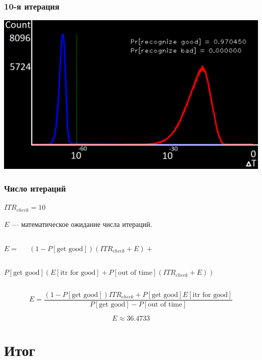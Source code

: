 \documentclass{beamer}
\begin{document}
\begin{frame}
	\frametitle{10-я итерация}
	
	\centerline{\includegraphics[scale=0.51]{distribution_10.png}}
	
\end{frame}


\begin{frame}[fragile]
\begin{spacing}{1.5}
	\frametitle{Число итераций}
	
	$ITR_{check} = 10$
	
	$E$ --- математическое ожидание числа итераций.\\
	\begin{columns}[c]
		$E = $
		
		$(1-P[\text{get good}])(ITR_{check} + E) +$
	\end{columns}
	\begin{columns}[c]
		
		$P[\text{get good}](E[\text{itr for good}] + P[\text{out of time}](ITR_{check} + E))$
	\end{columns}
	
	$$E = \frac{(1-P[\text{get good}])ITR_{check} + P[\text{get good}]E[\text{itr for good}]}{P[\text{get good}] - P[\text{out of time}]}$$
	
	$$E \approx 36.4733$$
\end{spacing}
\end{frame}

\section{Итог}
\end{document}

